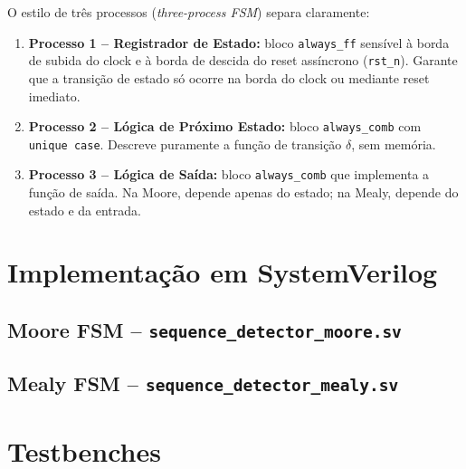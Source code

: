 \documentclass[12pt,a4paper]{article}
\begin{document}
O estilo de três processos (\textit{three-process FSM}) separa claramente:

\begin{enumerate}[leftmargin=1.5cm]
  \item \textbf{Processo 1 -- Registrador de Estado:} bloco \texttt{always\_ff}
        sensível à borda de subida do clock e à borda de descida do reset
        assíncrono (\texttt{rst\_n}). Garante que a transição de estado só ocorre
        na borda do clock ou mediante reset imediato.
  \item \textbf{Processo 2 -- Lógica de Próximo Estado:} bloco \texttt{always\_comb}
        com \texttt{unique case}. Descreve puramente a função de transição $\delta$,
        sem memória.
  \item \textbf{Processo 3 -- Lógica de Saída:} bloco \texttt{always\_comb} que
        implementa a função de saída. Na Moore, depende apenas do estado; na Mealy,
        depende do estado e da entrada.
\end{enumerate}

\section{Implementação em SystemVerilog}

\subsection{Moore FSM -- \texttt{sequence\_detector\_moore.sv}}



\subsection{Mealy FSM -- \texttt{sequence\_detector\_mealy.sv}}



\section{Testbenches}
\end{document}
